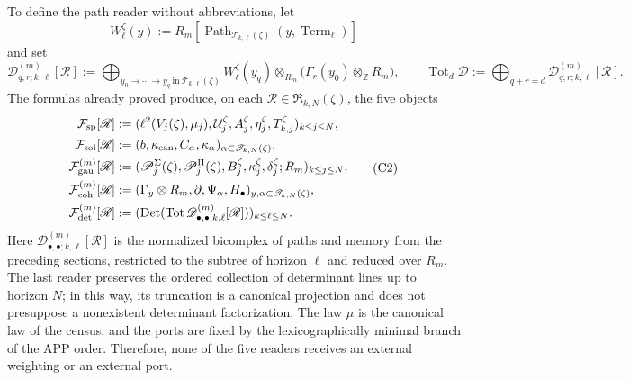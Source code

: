 To define the path reader without abbreviations, let
\[
 W_\ell^\zeta(y):=
 R_m[\operatorname{Path}_{\mathscr T_{k,\ell}(\zeta)}
          (y,\operatorname{Term}_\ell)]
\]
and set
\[
 \mathscr D_{q,r;k,\ell}^{(m)}[\mathscr R]
 :=\bigoplus_{y_0\to\cdots\to y_q\ \text{in}\
                  \mathscr T_{k,\ell}(\zeta)}
 W_\ell^\zeta(y_q)\otimes_{R_m}
 \bigl(\Gamma_r(y_0)\otimes_{\mathbb Z}R_m\bigr),
 \qquad
 \operatorname{Tot}_d\mathscr D
 :=\bigoplus_{q+r=d}\mathscr D_{q,r;k,\ell}^{(m)}[\mathscr R].
\]
The formulas already proved produce, on each
\(\mathscr R\in\mathfrak R_{k,N}(\zeta)\), the five objects
\[
\begin{aligned}
 \mathcal F_{\rm sp}[\mathscr R]
 &:=(\ell^2(V_j(\zeta),\mu_j),
       \mathcal U_j^\zeta,A_j^\zeta,\eta_j^\zeta,
       T_{k,j}^\zeta)_{k\leq j\leq N},\\
 \mathcal F_{\rm sol}[\mathscr R]
 &:=(b,\kappa_{\rm can},C_\alpha,\kappa_\alpha)
      _{\alpha\subset\mathscr T_{k,N}(\zeta)},\\
 \mathcal F_{\rm gau}^{(m)}[\mathscr R]
 &:=(\mathscr P_j^\Sigma(\zeta),\mathscr P_j^\Pi(\zeta),
       B_j^\zeta,\kappa_j^\zeta,\delta_j^\zeta;R_m)_{k\leq j\leq N},\\
 \mathcal F_{\rm coh}^{(m)}[\mathscr R]
 &:=(\Gamma_y\otimes R_m,\partial,\Psi_\alpha,H_\bullet)
      _{y,\alpha\subset\mathscr T_{k,N}(\zeta)},\\
 \mathcal F_{\rm det}^{(m)}[\mathscr R]
 &:=(\operatorname{Det}(\operatorname{Tot}
       \mathscr D_{\bullet,\bullet;k,\ell}^{(m)}[\mathscr R]))
       _{k\leq\ell\leq N}.
\end{aligned}
\tag{C2}
\label{act21:eq:cinco-lectores-comunes}
\]
Here \(\mathscr D_{\bullet,\bullet;k,\ell}^{(m)}[\mathscr R]\) is the normalized
bicomplex
of paths and memory from the preceding sections, restricted to the subtree of
horizon \(\ell\) and reduced over \(R_m\). The last reader preserves the
ordered collection of determinant lines up to horizon \(N\); in this
way, its truncation is a canonical projection and does not presuppose a
nonexistent determinant factorization. The law \(\mu\) is the canonical law
of the census, and the ports are fixed by the lexicographically minimal branch
of the APP order. Therefore, none of the five readers receives an external weighting
or an external port.

